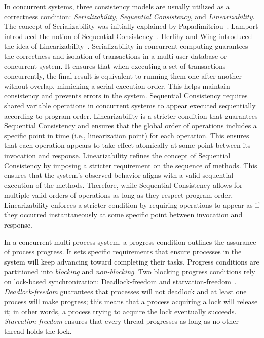 In concurrent systems, three consistency models are usually utilized as a correctness condition: \textit{Serializability}, \textit{Sequential Consistency}, and \textit{Linearizability}. The concept of Serializability was initially explained by Papadimitriou~\cite{DBLP_journals_jacm_Papadimitriou79b}. Lamport introduced the notion of Sequential Consistency~\cite{lamport1979how}. Herlihy and Wing introduced the idea of Linearizability~\cite{DBLP_journals_toplas_HerlihyW90DBLP_journals_toplas_HerlihyW90}.
Serializability in concurrent computing guarantees the correctness and isolation of transactions in a multi-user database or concurrent system. It ensures that when executing a set of transactions concurrently, the final result is equivalent to running them one after another without overlap, mimicking a serial execution order. This helps maintain consistency and prevents errors in the system. 
Sequential Consistency requires shared variable operations in concurrent systems to appear executed sequentially according to program order. Linearizability is a stricter condition that guarantees Sequential Consistency and ensures that the global order of operations includes a specific point in time (i.e., linearization point) for each operation. This ensures that each operation appears to take effect atomically at some point between its invocation and response. Linearizability refines the concept of Sequential Consistency by imposing a stricter requirement on the sequence of methods. This ensures that the system's observed behavior aligns with a valid sequential execution of the methods. Therefore, while Sequential Consistency allows for multiple valid orders of operations as long as they respect program order, Linearizability enforces a stricter condition by requiring operations to appear as if they occurred instantaneously at some specific point between invocation and response. 

In a concurrent multi-process system, a progress condition outlines the assurance of process progress. It sets specific requirements that ensure processes in the system will keep advancing toward completing their tasks. Progress conditions are partitioned into \textit{blocking} and \textit{non-blocking}. Two blocking progress conditions rely on lock-based synchronization: Deadlock-freedom and starvation-freedom~\cite{DBLP_books_daglib_0020056}. \textit{Deadlock-freedom} guarantees that processes will not deadlock and at least one process will make progress; this means that a process acquiring a lock will release it; in other words, a process trying to acquire the lock eventually succeeds. \textit{Starvation-freedom} ensures that every thread progresses as long as no other thread holds the lock.

